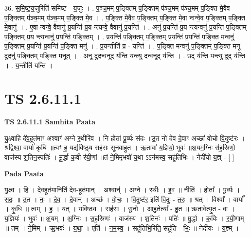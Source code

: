 \documentclass[17pt]{extarticle}
\begin{document}
36. स॒मि॒ष्ट॒य॒जुरिति॑ समिष्ट - य॒जुः । . प॒ञ्च॒मम् प॒ङ्क्तिम् प॒ङ्क्तिम् प॑ञ्च॒मम् प॑ञ्च॒मम् प॒ङ्क्ति मे॒वैव प॒ङ्क्तिम् प॑ञ्च॒मम् प॑ञ्च॒मम् प॒ङ्क्ति मे॒व । . प॒ङ्क्ति मे॒वैव प॒ङ्क्तिम् प॒ङ्क्ति मे॒वा न्वन्वे॒व प॒ङ्क्तिम् प॒ङ्क्ति मे॒वानु॑ । . ए॒वा न्वन्वे॒ वैवानु॑ प्र॒यन्ति॑ प्र॒य न्त्यन्वे॒ वैवानु॑ प्र॒यन्ति॑ । . अनु॑ प्र॒यन्ति॑ प्र॒य न्त्यन्वनु॑ प्र॒यन्ति॑ प॒ङ्क्तिम् प॒ङ्क्तिम् प्र॒य न्त्यन्वनु॑ प्र॒यन्ति॑ प॒ङ्क्तिम् । . प्र॒यन्ति॑ प॒ङ्क्तिम् प॒ङ्क्तिम् प्र॒यन्ति॑ प्र॒यन्ति॑ प॒ङ्क्ति मन्वनु॑ प॒ङ्क्तिम् प्र॒यन्ति॑ प्र॒यन्ति॑ प॒ङ्क्ति मनु॑ । . प्र॒यन्तीति॑ प्र - यन्ति॑ । . प॒ङ्क्ति मन्वनु॑ प॒ङ्क्तिम् प॒ङ्क्ति मनू दुदनु॑ प॒ङ्क्तिम् प॒ङ्क्ति मनूत् । . अनू दुदन्वनूद् य॑न्ति य॒न्त्यु दन्वनूद् य॑न्ति । . उद् य॑न्ति य॒न्त्यु दुद् य॑न्ति । . य॒न्तीति॑ यन्ति । \newline
\pagebreak
{}
\section*{ TS 2.6.11.1 }

\textbf{TS 2.6.11.1 } \newline
\textbf{Samhita Paata} \newline

यु॒क्ष्वाहि दे॑व॒हूत॑माꣳ॒॒ अश्वाꣳ॑ अग्ने र॒थीरि॑व । नि होता॑ पू॒र्व्यः स॑दः ॥उ॒त नो॑ देव दे॒वाꣳ अच्छा॑ वोचो वि॒दुष्ट॑रः । श्रद्विश्वा॒ वार्या॑ कृधि ॥त्वꣳ ह॒ यद्य॑विष्ठ्॒य सह॑सः सूनवाहुत । ऋ॒तावा॑ य॒ज्ञियो॒ भुवः॑ ॥अ॒यम॒ग्निः स॑ह॒स्रिणो॒ वाज॑स्य श॒तिन॒स्पतिः॑ । मू॒र्द्धा क॒वी र॑यी॒णां ॥तं ने॒मिमृ॒भवो॑ य॒था ऽऽन॑मस्व॒ सहू॑तिभिः । नेदी॑यो य॒ज्ञ् - [  ] \newline

\textbf{Pada Paata} \newline

यु॒क्ष्व । हि । दे॒व॒हूत॑मा॒निति॑ देव-हूत॑मान् । अश्वान्॑ । अ॒ग्ने॒ । र॒थीः । इ॒व॒ ॥ नीति॑ । होता᳚ । पू॒र्व्यः । स॒दः॒ ॥ उ॒त । नः॒ । दे॒व॒ । दे॒वान् । अच्छ॑ । वो॒चः॒ । वि॒दुष्ट॑र॒ इति॑ वि॒दुः - त॒रः॒ ॥ श्रत् । विश्वा᳚ । वार्या᳚ । कृ॒धि॒ ॥ त्वम् । ह॒ । यत् । य॒वि॒ष्ठ्य॒ । सह॑सः । सू॒नो॒ । आ॒हु॒तेत्या᳚ - हु॒त॒ ॥ ऋ॒तावेत्यृ॒त - वा॒ । य॒ज्ञियः॑ । भुवः॑ ॥ अ॒यम् । अ॒ग्निः । स॒ह॒स्रिणः॑ । वाज॑स्य । श॒तिनः॑ । पतिः॑ ॥ मू॒र्द्धा । क॒विः । र॒यी॒णाम् ॥ तम् । ने॒मिम् । ऋ॒भवः॑ । य॒था॒ । एति॑ । न॒म॒स्व॒ । सहू॑तिभि॒रिति॒ सहू॑ति - भिः॒ ॥ नेदी॑यः । य॒ज्ञ्म् ।  \newline
\end{document}
